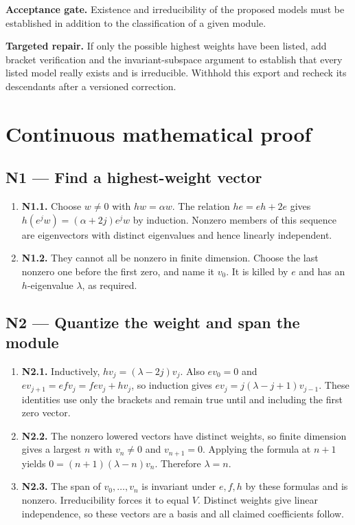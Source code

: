 \documentclass[preprint,12pt,aps,pra,showkeys,amsmath,amssymb,superscriptaddress,floatfix]{revtex4-2}
\theoremstyle{definition}
\theoremstyle{remark}
\newcommand{\field}[2]{\par\smallskip\noindent\textbf{#1.} #2\par}
\begin{document}
\field{Acceptance gate}{Existence and irreducibility of the proposed models must be established
in addition to the classification of a given module.}

\field{Targeted repair}{If only the possible highest weights have been listed, add bracket
verification and the invariant-subspace argument to establish that every
listed model really exists and is irreducible. Withhold this export and
recheck its descendants after a versioned correction.}

\endgroup

\endgroup\clearpage\section{Continuous mathematical proof}\label{sec:proof}

\subsection{N1 --- Find a highest-weight
vector}\label{n1-find-a-highest-weight-vector}

\begin{enumerate}
\def\labelenumi{\arabic{enumi}.}
\item
  \textbf{N1.1.} Choose \(w\ne0\) with \(hw=\alpha w\). The relation
  \(he=eh+2e\) gives \(h(e^jw)=(\alpha+2j)e^jw\) by induction. Nonzero
  members of this sequence are eigenvectors with distinct eigenvalues
  and hence linearly independent.
\item
  \textbf{N1.2.} They cannot all be nonzero in finite dimension. Choose
  the last nonzero one before the first zero, and name it \(v_0\). It is
  killed by \(e\) and has an \(h\)-eigenvalue \(\lambda\), as required.
\end{enumerate}

\subsection{N2 --- Quantize the weight and span the
module}\label{n2-quantize-the-weight-and-span-the-module}

\begin{enumerate}
\def\labelenumi{\arabic{enumi}.}
\item
  \textbf{N2.1.} Inductively, \(hv_j=(\lambda-2j)v_j\). Also \(ev_0=0\)
  and \(ev_{j+1}=efv_j=fev_j+hv_j\), so induction gives
  \(ev_j=j(\lambda-j+1)v_{j-1}\). These identities use only the brackets
  and remain true until and including the first zero vector.
\item
  \textbf{N2.2.} The nonzero lowered vectors have distinct weights, so
  finite dimension gives a largest \(n\) with \(v_n\ne0\) and
  \(v_{n+1}=0\). Applying the formula at \(n+1\) yields
  \(0=(n+1)(\lambda-n)v_n\). Therefore \(\lambda=n\).
\item
  \textbf{N2.3.} The span of \(v_0,\ldots,v_n\) is invariant under
  \(e,f,h\) by these formulas and is nonzero. Irreducibility forces it
  to equal \(V\). Distinct weights give linear independence, so these
  vectors are a basis and all claimed coefficients follow.
\end{enumerate}
\end{document}
